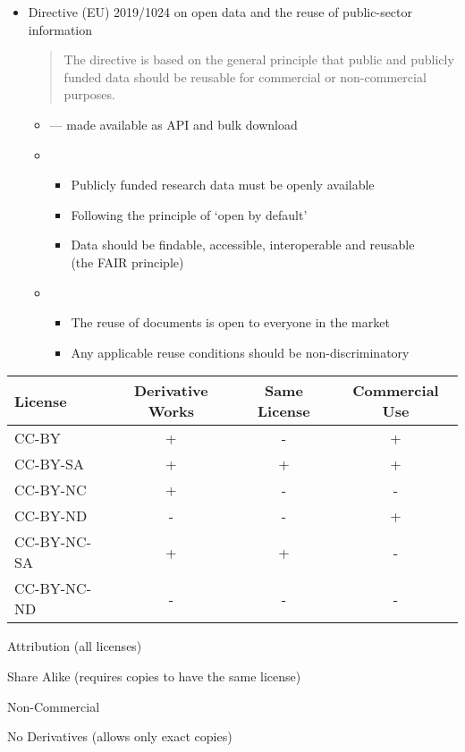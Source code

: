 \documentclass[a4paper,landscape,headrule,footrule,xetex]{foils}
\begin{document}
\begin{itemize}
\item Directive (EU) 2019/1024 on open data and the reuse of public-sector information
  \begin{quote}
    The directive is based on the general principle that public and publicly funded data should be reusable for commercial or non-commercial purposes.
  \end{quote}
  \begin{itemize}
  \item {} --- made available as API and bulk download
  \item {}
    \begin{itemize}
    \item Publicly funded research data must be openly available
    \item Following the principle of ‘open by default’
    \item Data should be findable, accessible, interoperable and reusable
      \\ (the FAIR principle)
    \end{itemize}
  \item {}
    \begin{itemize}
    \item The reuse of documents is open to everyone in the market
    \item Any applicable reuse conditions should be non-discriminatory
    \end{itemize}
  \end{itemize}
\end{itemize}


\medskip
\begin{tabular}{lccc}
  License       & Derivative Works & Same License & Commercial Use \\
\hline
  CC-BY         &   + &  - &  + \\
  CC-BY-SA      &   + &  + &  + \\  
  CC-BY-NC      &   + &  - &  - \\
  CC-BY-ND      &   - &  - &  + \\
  CC-BY-NC-SA   &   + &  + &  - \\
  CC-BY-NC-ND   &   - &  - &  - \\
\end{tabular}
\begin{description} \addtolength{\itemsep}{-0.5\itemsep}
\item[BY] Attribution (all licenses)
\item[SA] Share Alike (requires copies to have the same license)
\item[NC] Non-Commercial
\item[ND] No Derivatives (allows only exact copies) 
\end{description}
\end{document}

